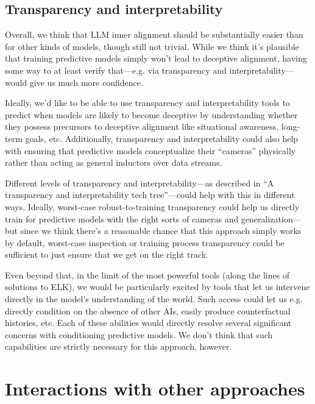 {\subsection{Transparency and interpretability}

Overall, we think that LLM inner alignment should be substantially easier than for other kinds of models, though still not trivial. While we think it's plausible that training predictive models simply won't lead to deceptive alignment, having some way to at least verify that---e.g. via transparency and interpretability---would give us much more confidence.

Ideally, we'd like to be able to use transparency and interpretability tools to predict when models are likely to become deceptive by understanding whether they possess precursors to deceptive alignment like situational awareness, long-term goals, etc. Additionally, transparency and interpretability could also help with ensuring that predictive models conceptualize their ``cameras'' physically rather than acting as general inductors over data streams.

Different levels of transparency and interpretability---as described in ``A transparency and interpretability tech tree\cite{TODO: cite https://www.alignmentforum.org/posts/nbq2bWLcYmSGup9aF/a-transparency-and-interpretability-tech-tree}''---could help with this in different ways. Ideally, worst-case robust-to-training transparency could help us directly train for predictive models with the right sorts of cameras and generalization---but since we think there's a reasonable chance that this approach simply works by default, worst-case inspection or training process transparency could be sufficient to just ensure that we get on the right track.

Even beyond that, in the limit of the most powerful tools (along the lines of solutions to ELK), we would be particularly excited by tools that let us intervene directly in the model's understanding of the world. Such access could let us e.g. directly condition on the absence of other AIs, easily produce counterfactual histories, etc. Each of these abilities would directly resolve several significant concerns with conditioning predictive models. We don't think that such capabilities are strictly necessary for this approach, however.





\section{Interactions with other approaches}
\label{sec:5}


}
